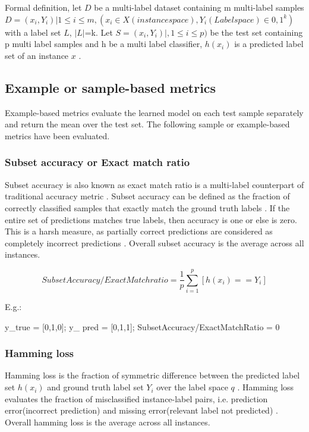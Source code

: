 \\
\\
Formal definition, let $D$ be a multi-label dataset containing m multi-label samples $D = {(x_i,Y_i)|1\leq i \leq m}, (x_i \in X (instance space), Y_i (Label space) \in {0,1}^k)$ with a label set $L$, $|L|$=k. Let $S = {(x_i,Y_i) | ,1\leq i \leq p)}$ be the test set containing p multi label samples and h be a multi label classifier, $h(x_i)$ is a predicted label set of an instance $x$ \cite{zhang2013review}.

\subsection{Example or sample-based metrics}
Example-based metrics evaluate the learned model on each test sample separately and return the mean over the test set\cite{zhang2013review}. The following sample or example-based metrics have been evaluated.
 
\subsubsection{Subset accuracy or Exact match ratio}
 Subset accuracy is also known as exact match ratio is a multi-label counterpart of traditional accuracy metric \cite{zhang2013review}. Subset accuracy can be defined as the fraction of correctly classified samples that exactly match the ground truth labels \cite{zhang2013review}. If the entire set of predictions matches true labels, then accuracy is one or else is zero. This is a harsh measure, as partially correct predictions are considered as completely incorrect predictions\cite{sorower2010literature} \cite{zhang2010multi}.  Overall subset accuracy is the average across all instances. 

 $$Subset Accuracy / Exact Match ratio = \frac{1}{p}\sum_{i =1}^{p}[h(x_i) == Y_i]$$

E.g.: 

y\_true = [0,1,0]; 
y\_ pred = [0,1,1];  
SubsetAccuracy/ExactMatchRatio = 0
 
\subsubsection{Hamming loss}

Hamming loss is the fraction of symmetric difference between the predicted label set $h(x_i)$ and ground truth label set $Y_i$ over the label space $q$ \cite{zhang2010multi}. Hamming loss evaluates the fraction of misclassified  instance-label pairs, i.e. prediction error(incorrect prediction) and missing error(relevant label not predicted) \cite{sorower2010literature}.  Overall hamming loss is the average across all instances.

